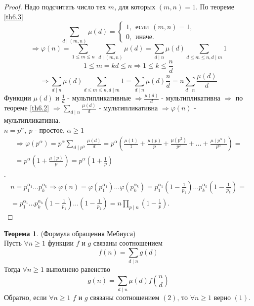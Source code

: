 \documentclass[a4paper, 12pt]{article}
\renewcommand{\phi}{\varphi}
\renewcommand{\div}{\mid}
\theoremstyle{definition}
\newtheorem{theorem}{Теорема}[section]
\begin{document}
    \begin{proof}
        Надо подсчитать число тех $m$, для которых $(m,n)=1$. По теореме \ref{th6.3}
        \[\sum\limits_{d\div (m,n)}\mu(d)=\begin{cases}
            1, \hspace{5pt} \text{если} \hspace{5pt} (m,n)=1,\\
            0, \hspace{5pt} \text{иначе}.
        \end{cases}\]
        \[\Rightarrow \phi(n)=\sum\limits_{1\leq m\leq n}\ \sum\limits_{d\div (m,n)}\mu(d)=\sum_{d\div n}\mu(d)\sum\limits_{d\leq m\leq n, d\div m}1\]
        \[1\leq m=kd\leq n \Rightarrow 1\leq k\leq \frac{n}{d}\]
        \[\Rightarrow \sum_{d\div n}\mu(d)\sum\limits_{d\leq m\leq n, d\div m}1 =\sum\limits_{d\div n}\mu(d)\frac{n}{d}=n\sum\limits_{d\div n}\frac{\mu(d)}{d}\] Функции $\mu(d)$ и $\frac{1}{d}$ - мультипликативные $\Rightarrow \frac{\mu(d)}{d}$ - мультипликативна $\Rightarrow$ по теореме \ref{th6.2} $\Rightarrow \sum\limits_{d\div n}\frac{\mu(d)}{d}$ - мультипликативна $\Rightarrow \phi(n)$ - мультипликативна.\\
        $n=p^{\alpha},\ p$ - простое, $\alpha\geq 1$
        \begin{multline*}
            \Rightarrow \phi(p^{\alpha})=p^{\alpha}\sum\limits_{d \div p^{\alpha}}\frac{\mu(d)}{d}=p^{\alpha}(\frac{\mu(1)}{1}+\frac{\mu(p)}{p}+\frac{\mu(p^2)}{p^2}+\dots+\frac{\mu(p^{\alpha})}{p^{\alpha}})=\\
            =p^{\alpha}(1+\frac{\mu(p)}{p})=p^{\alpha}(1+\frac{1}{p})
        \end{multline*}.
        \begin{multline*}
            n=p_1^{\alpha_1}\dots p_k^{\alpha_k}\Rightarrow \phi(n)=\phi(p_1^{\alpha_1})\dots \phi(p_k^{\alpha_k})=p_1^{\alpha_1}(1-\frac{1}{p_1})\dots p_k^{\alpha_k}(1-\frac{1}{p_k})=\\
            =p_1^{\alpha_1}\dots p_k^{\alpha_k}(1-\frac{1}{p_1})\dots (1-\frac{1}{p_k})=n\prod\limits_{p\div n}(1-\frac{1}{p}).
        \end{multline*}
    \end{proof}
    \begin{theorem}(Формула обращения Мебиуса)\label{th6.5}\\
        Пусть $\forall n\geq 1$ функции $f$ и $g$ связаны соотношением
        \begin{equation}
            f(n)=\sum\limits_{d\div n}g(d)
        \end{equation}
        Тогда $\forall n\geq 1$ выполнено равенство
        \begin{equation}
            g(n)=\sum\limits_{d\div n}\mu(d)f(\frac{n}{d})
        \end{equation}
        Обратно, если $\forall n\geq 1$ $f$ и $g$ связаны соотношением $(2)$, то $\forall n\geq 1$ верно $(1)$. 
    \end{theorem} 
\end{document}
